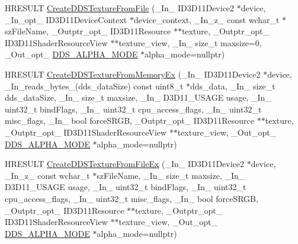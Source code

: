 \begin{DoxyCompactItemize}
\item 
H\+R\+E\+S\+U\+LT \hyperlink{namespacemage_abec1d90d8e2d6c8ce1bfa74c2854bdfe}{Create\+D\+D\+S\+Texture\+From\+File} (\+\_\+\+In\+\_\+ I\+D3\+D11\+Device2 $\ast$device, \+\_\+\+In\+\_\+opt\+\_\+ I\+D3\+D11\+Device\+Context $\ast$device\+\_\+context, \+\_\+\+In\+\_\+z\+\_\+ const wchar\+\_\+t $\ast$sz\+File\+Name, \+\_\+\+Outptr\+\_\+opt\+\_\+ I\+D3\+D11\+Resource $\ast$$\ast$texture, \+\_\+\+Outptr\+\_\+opt\+\_\+ I\+D3\+D11\+Shader\+Resource\+View $\ast$$\ast$texture\+\_\+view, \+\_\+\+In\+\_\+ size\+\_\+t maxsize=0, \+\_\+\+Out\+\_\+opt\+\_\+ \hyperlink{namespacemage_a0c586a2bad862f4858900ca121ca80c2}{D\+D\+S\+\_\+\+A\+L\+P\+H\+A\+\_\+\+M\+O\+DE} $\ast$alpha\+\_\+mode=nullptr)
\item 
H\+R\+E\+S\+U\+LT \hyperlink{namespacemage_a7102f0f3479074447a084e95bce3cc14}{Create\+D\+D\+S\+Texture\+From\+Memory\+Ex} (\+\_\+\+In\+\_\+ I\+D3\+D11\+Device2 $\ast$device, \+\_\+\+In\+\_\+reads\+\_\+bytes\+\_\+(dds\+\_\+data\+Size) const uint8\+\_\+t $\ast$dds\+\_\+data, \+\_\+\+In\+\_\+ size\+\_\+t dds\+\_\+data\+Size, \+\_\+\+In\+\_\+ size\+\_\+t maxsize, \+\_\+\+In\+\_\+ D3\+D11\+\_\+\+U\+S\+A\+GE usage, \+\_\+\+In\+\_\+ uint32\+\_\+t bind\+Flags, \+\_\+\+In\+\_\+ uint32\+\_\+t cpu\+\_\+access\+\_\+flags, \+\_\+\+In\+\_\+ uint32\+\_\+t misc\+\_\+flags, \+\_\+\+In\+\_\+ bool force\+S\+R\+GB, \+\_\+\+Outptr\+\_\+opt\+\_\+ I\+D3\+D11\+Resource $\ast$$\ast$texture, \+\_\+\+Outptr\+\_\+opt\+\_\+ I\+D3\+D11\+Shader\+Resource\+View $\ast$$\ast$texture\+\_\+view, \+\_\+\+Out\+\_\+opt\+\_\+ \hyperlink{namespacemage_a0c586a2bad862f4858900ca121ca80c2}{D\+D\+S\+\_\+\+A\+L\+P\+H\+A\+\_\+\+M\+O\+DE} $\ast$alpha\+\_\+mode=nullptr)
\item 
H\+R\+E\+S\+U\+LT \hyperlink{namespacemage_ae578f902db78efb1e9466399d72fbdbd}{Create\+D\+D\+S\+Texture\+From\+File\+Ex} (\+\_\+\+In\+\_\+ I\+D3\+D11\+Device2 $\ast$device, \+\_\+\+In\+\_\+z\+\_\+ const wchar\+\_\+t $\ast$sz\+File\+Name, \+\_\+\+In\+\_\+ size\+\_\+t maxsize, \+\_\+\+In\+\_\+ D3\+D11\+\_\+\+U\+S\+A\+GE usage, \+\_\+\+In\+\_\+ uint32\+\_\+t bind\+Flags, \+\_\+\+In\+\_\+ uint32\+\_\+t cpu\+\_\+access\+\_\+flags, \+\_\+\+In\+\_\+ uint32\+\_\+t misc\+\_\+flags, \+\_\+\+In\+\_\+ bool force\+S\+R\+GB, \+\_\+\+Outptr\+\_\+opt\+\_\+ I\+D3\+D11\+Resource $\ast$$\ast$texture, \+\_\+\+Outptr\+\_\+opt\+\_\+ I\+D3\+D11\+Shader\+Resource\+View $\ast$$\ast$texture\+\_\+view, \+\_\+\+Out\+\_\+opt\+\_\+ \hyperlink{namespacemage_a0c586a2bad862f4858900ca121ca80c2}{D\+D\+S\+\_\+\+A\+L\+P\+H\+A\+\_\+\+M\+O\+DE} $\ast$alpha\+\_\+mode=nullptr)

\end{DoxyCompactItemize}
